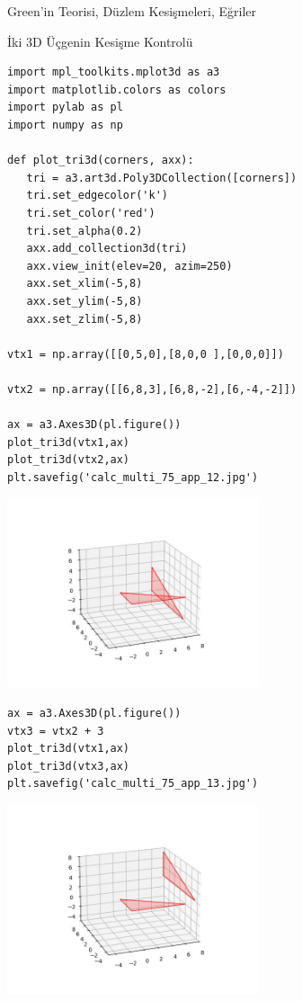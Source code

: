 \documentclass[12pt,fleqn]{article}\usepackage{../../common}
\begin{document}
Green'in Teorisi, Düzlem Kesişmeleri, Eğriler

İki 3D Üçgenin Kesişme Kontrolü

\begin{verbatim}
import mpl_toolkits.mplot3d as a3
import matplotlib.colors as colors
import pylab as pl
import numpy as np

def plot_tri3d(corners, axx):
   tri = a3.art3d.Poly3DCollection([corners])   
   tri.set_edgecolor('k')
   tri.set_color('red')
   tri.set_alpha(0.2)
   axx.add_collection3d(tri)
   axx.view_init(elev=20, azim=250)
   axx.set_xlim(-5,8)
   axx.set_ylim(-5,8)
   axx.set_zlim(-5,8)   

vtx1 = np.array([[0,5,0],[8,0,0 ],[0,0,0]])

vtx2 = np.array([[6,8,3],[6,8,-2],[6,-4,-2]])

ax = a3.Axes3D(pl.figure())
plot_tri3d(vtx1,ax)
plot_tri3d(vtx2,ax)
plt.savefig('calc_multi_75_app_12.jpg')
\end{verbatim}

\includegraphics[width=20em]{calc_multi_75_app_12.jpg}

\begin{verbatim}
ax = a3.Axes3D(pl.figure())
vtx3 = vtx2 + 3
plot_tri3d(vtx1,ax)
plot_tri3d(vtx3,ax)
plt.savefig('calc_multi_75_app_13.jpg')
\end{verbatim}

\includegraphics[width=20em]{calc_multi_75_app_13.jpg}
\end{document}
